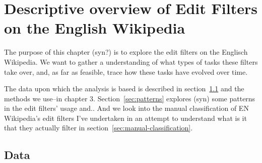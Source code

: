 \chapter{Descriptive overview of Edit Filters on the English Wikipedia}
\label{chap:overview-en-wiki}

The purpose of this chapter (syn?) is to explore the edit filters on the Englisch Wikipedia.
We want to gather a understanding of what types of tasks these filters take over,
and, as far as feasible, trace how these tasks have evolved over time.

The data upon which the analysis is based is described in section~\ref{sec:overview-data}
and the methods we use–in chapter 3.
Section~\ref{sec:patterns} explores (syn) some patterns in the edit filters' usage and..
And we look into the manual classification of EN Wikipedia's edit filters I've undertaken in an attempt to understand what is it that they actually filter in section~\ref{sec:manual-classification}.

\section{Data}
\label{sec:overview-data}

